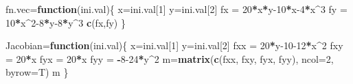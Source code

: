 \documentclass[
]{book}
\newenvironment{Shaded}{\begin{snugshade}}{\end{snugshade}}
\newcommand{\AttributeTok}[1]{\textcolor[rgb]{0.13,0.29,0.53}{#1}}
\newcommand{\ControlFlowTok}[1]{\textcolor[rgb]{0.13,0.29,0.53}{\textbf{#1}}}
\newcommand{\DecValTok}[1]{\textcolor[rgb]{0.00,0.00,0.81}{#1}}
\newcommand{\FunctionTok}[1]{\textcolor[rgb]{0.13,0.29,0.53}{\textbf{#1}}}
\newcommand{\NormalTok}[1]{#1}
\newcommand{\OtherTok}[1]{\textcolor[rgb]{0.56,0.35,0.01}{#1}}
\newcommand{\SpecialCharTok}[1]{\textcolor[rgb]{0.81,0.36,0.00}{\textbf{#1}}}
\begin{document}
\begin{Shaded}
\begin{Highlighting}[]
\NormalTok{fn.vec}\OtherTok{=}\ControlFlowTok{function}\NormalTok{(ini.val)\{}
\NormalTok{ x}\OtherTok{=}\NormalTok{ini.val[}\DecValTok{1}\NormalTok{]}
\NormalTok{ y}\OtherTok{=}\NormalTok{ini.val[}\DecValTok{2}\NormalTok{]}
\NormalTok{ fx }\OtherTok{=} \DecValTok{20}\SpecialCharTok{*}\NormalTok{x}\SpecialCharTok{*}\NormalTok{y}\DecValTok{{-}10}\SpecialCharTok{*}\NormalTok{x}\DecValTok{{-}4}\SpecialCharTok{*}\NormalTok{x}\SpecialCharTok{\^{}}\DecValTok{3}
\NormalTok{ fy }\OtherTok{=} \DecValTok{10}\SpecialCharTok{*}\NormalTok{x}\SpecialCharTok{\^{}}\DecValTok{2{-}8}\SpecialCharTok{*}\NormalTok{y}\DecValTok{{-}8}\SpecialCharTok{*}\NormalTok{y}\SpecialCharTok{\^{}}\DecValTok{3}
 \FunctionTok{c}\NormalTok{(fx,fy)}
\NormalTok{\}}

\NormalTok{Jacobian}\OtherTok{=}\ControlFlowTok{function}\NormalTok{(ini.val)\{}
\NormalTok{ x}\OtherTok{=}\NormalTok{ini.val[}\DecValTok{1}\NormalTok{]}
\NormalTok{ y}\OtherTok{=}\NormalTok{ini.val[}\DecValTok{2}\NormalTok{]}
\NormalTok{ fxx }\OtherTok{=} \DecValTok{20}\SpecialCharTok{*}\NormalTok{y}\DecValTok{{-}10{-}12}\SpecialCharTok{*}\NormalTok{x}\SpecialCharTok{\^{}}\DecValTok{2}
\NormalTok{ fxy }\OtherTok{=} \DecValTok{20}\SpecialCharTok{*}\NormalTok{x}
\NormalTok{ fyx }\OtherTok{=} \DecValTok{20}\SpecialCharTok{*}\NormalTok{x}
\NormalTok{ fyy }\OtherTok{=} \SpecialCharTok{{-}}\DecValTok{8{-}24}\SpecialCharTok{*}\NormalTok{y}\SpecialCharTok{\^{}}\DecValTok{2}
\NormalTok{ m}\OtherTok{=}\FunctionTok{matrix}\NormalTok{(}\FunctionTok{c}\NormalTok{(fxx, fxy, fyx, fyy), }\AttributeTok{ncol=}\DecValTok{2}\NormalTok{, }\AttributeTok{byrow=}\NormalTok{T)}
\NormalTok{ m}
\NormalTok{\}}


\end{Highlighting}
\end{Shaded}
\end{document}

